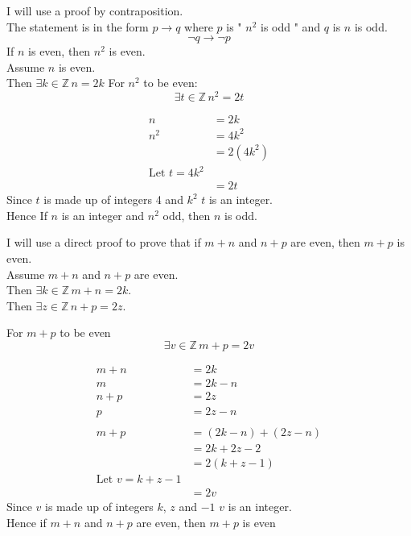 \documentclass[12pt letter]{report}
\begin{document}
\begin{myproof}
  I will use a proof by contraposition.\\
  The statement is in the form $p \to q$ where $p$ is " $n^2$ is odd " and $q$ is $n$ is odd.\\
  \[
    \neg q \to \neg p
  \]
  If $n$ is even, then $n^2$ is even.\\
  Assume $n$ is even.\\
  Then $\exists k \in \mathbb{Z} \, n = 2k$
  For $n^2$ to be even:
  \[
    \exists t \in \mathbb{Z} \, n^2 = 2t
  \]

  \begin{align*}
    n   & = 2k                    \\
    n^2 & = 4k^2                  \\
        & = 2 \left( 4k^2 \right) \\
    \text{Let } t = 4k^2          \\
        & = 2t
  \end{align*}
  Since $t$ is made up of integers 4 and $k^2$ $t$ is an integer.\\
  Hence If $n$ is an integer and $n^2$ odd, then $n$ is odd.
\end{myproof}


\begin{myproof}
  I will use a direct proof to prove that if $m + n$ and $n + p$ are even, then $m + p$ is even. \\
  Assume $m + n$ and $n + p$ are even.\\
  Then $\exists k \in \mathbb{Z}\, m + n = 2k$.\\
  Then $\exists z \in \mathbb{Z} \, n + p = 2z$.

  For $m + p$ to be even
  \[
    \exists v \in \mathbb{Z} \, m + p = 2v
  \]

  \begin{align*}
    m + n & = 2k                                             \\
    m     & = 2k - n                                         \\
    n + p & = 2z                                             \\
    p     & = 2z -n                                          \\
    \\
    m + p & = \left( 2k - n \right)  + \left( 2z - n \right) \\
          & = 2k + 2z -2                                     \\
          & = 2 \left( k + z -1  \right)                     \\
    \text{Let } v = k + z -1                                 \\
          & = 2v
  \end{align*}
  Since $v$ is made up of integers $k$, $z$ and $-1$ $v$ is an integer.\\
  Hence if $m + n$ and $n + p$ are even, then $m + p$ is even
\end{myproof}
\end{document}
